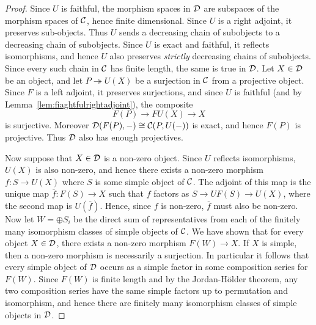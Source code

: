 \documentclass{amsart}
\begin{document}
\begin{proof}
	Since $U$ is faithful, the morphism spaces in $\mathcal D$ are subspaces of the morphism spaces of $\mathcal C$, hence finite dimensional. Since $U$ is a right adjoint, it preserves sub-objects. Thus $U$ sends a decreasing chain of  subobjects to a decreasing chain of subobjects. Since $U$ is exact and faithful, it reflects isomorphisms, and hence $U$ also preserves {\em strictly} decreasing chains of subobjects. Since every such chain in $\mathcal C$ has finite length, the same is true in $\mathcal D$. Let $X \in \mathcal D$ be an object, and let $P \twoheadrightarrow U(X)$ be a surjection in $\mathcal C$ from a projective object. Since $F$ is a left adjoint, it preserves surjections, and since $U$ is faithful (and by Lemma~\ref{lem:fiaghtfulrightadjoint}), the composite
	\begin{equation*}
		F(P) \to FU(X) \to X
	\end{equation*}
	is surjective. Moreover $\mathcal D(F(P), -) \cong \mathcal C(P, U(-))$ is exact, and hence $F(P)$ is projective. Thus $\mathcal D$ also has enough projectives. 
	
Now suppose that $X \in \mathcal D$ is a non-zero object. Since $U$ reflects isomorphisms, $U(X)$ is also non-zero, and hence there exists a non-zero morphism $f: S \to U(X)$ where $S$ is some simple object of $\mathcal C$. The adjoint of this map is the unique map $\overline{f}: F(S) \to X$ such that $f$ factors as $S \to UF(S) \to U(X)$, where the second map is $U(\overline{f})$. Hence, since $f$ is non-zero, $\overline{f}$ must also be non-zero.  Now let $W = \oplus S_i$ be the direct sum of representatives from each of the finitely many isomorphism classes of simple objects of $\mathcal C$. We have shown that for every object $X \in \mathcal D$, there exists a non-zero morphism $F(W) \to X$. If $X$ is simple, then a non-zero morphism is necessarily a surjection. In particular it follows that every simple object of $\mathcal D$ occurs as a simple factor in some composition series for $F(W)$. Since $F(W)$ is finite length and by the Jordan-H\"older theorem, any two composition series have the same simple factors up to permutation and isomorphism, and hence there are finitely many isomorphism classes of simple objects in $\mathcal D$.  
\end{proof}


\end{document}
